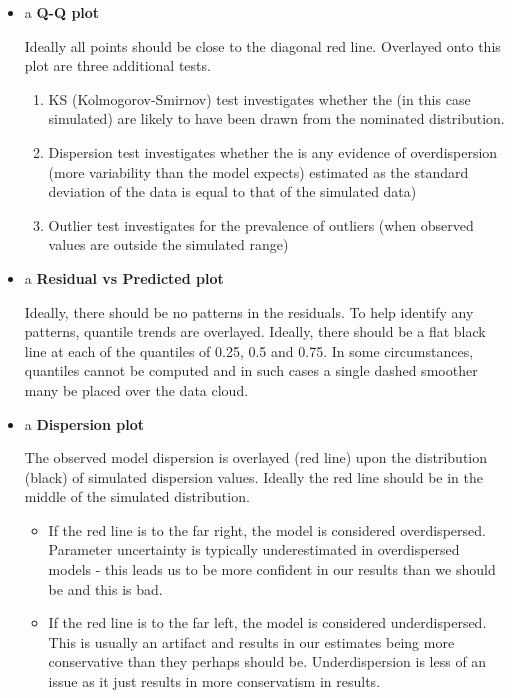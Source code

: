 \documentclass[
  8pt,
  a4paper]{article}
\providecommand{\tightlist}{%
  \setlength{\itemsep}{0pt}\setlength{\parskip}{0pt}}
\begin{document}
\begin{itemize}
\item
  a \textbf{Q-Q plot}

  Ideally all points should be close to the diagonal red line. Overlayed
  onto this plot are three additional tests.

  \begin{enumerate}
  \def\labelenumi{\arabic{enumi}.}
  \tightlist
  \item
    KS (Kolmogorov-Smirnov) test investigates whether the (in this case
    simulated) are likely to have been drawn from the nominated
    distribution.
  \item
    Dispersion test investigates whether the is any evidence of
    overdispersion (more variability than the model expects) estimated
    as the standard deviation of the data is equal to that of the
    simulated data)
  \item
    Outlier test investigates for the prevalence of outliers (when
    observed values are outside the simulated range)
  \end{enumerate}
\item
  a \textbf{Residual vs Predicted plot}

  Ideally, there should be no patterns in the residuals. To help
  identify any patterns, quantile trends are overlayed. Ideally, there
  should be a flat black line at each of the quantiles of 0.25, 0.5 and
  0.75. In some circumstances, quantiles cannot be computed and in such
  cases a single dashed smoother many be placed over the data cloud.
\item
  a \textbf{Dispersion plot}

  The observed model dispersion is overlayed (red line) upon the
  distribution (black) of simulated dispersion values. Ideally the red
  line should be in the middle of the simulated distribution.

  \begin{itemize}
  \tightlist
  \item
    If the red line is to the far right, the model is considered
    overdispersed. Parameter uncertainty is typically underestimated in
    overdispersed models - this leads us to be more confident in our
    results than we should be and this is bad.
  \item
    If the red line is to the far left, the model is considered
    underdispersed. This is usually an artifact and results in our
    estimates being more conservative than they perhaps should be.
    Underdispersion is less of an issue as it just results in more
    conservatism in results.
  \end{itemize}
\end{itemize}
\end{document}
